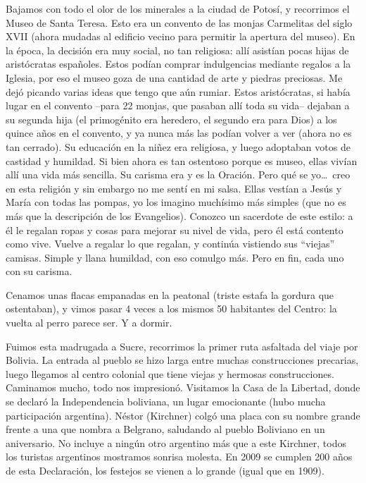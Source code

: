 Bajamos con todo el olor de los minerales a la ciudad de Potosí, y recorrimos
el Museo de Santa Teresa. Esto era un convento de las monjas Carmelitas del
siglo {\small XVII} (ahora mudadas al edificio vecino para permitir la
apertura del museo). En la época, la decisión era muy social, no tan
religiosa: allí asistían pocas hijas de aristócratas españoles. Estos
podían comprar indulgencias mediante regalos a la Iglesia, por eso el museo
goza de una cantidad de arte y piedras preciosas. Me dejó picando varias ideas
que tengo que aún rumiar. Estos aristócratas, si había lugar en el convento
--para 22 monjas, que pasaban allí toda su vida-- dejaban a su segunda hija (el
primogénito era heredero, el segundo era para Dios) a los quince años en el
convento, y ya nunca más las podían volver a ver (ahora no es tan cerrado). Su
educación en la niñez era religiosa, y luego adoptaban votos de castidad y
humildad. Si bien ahora es tan ostentoso porque es museo, ellas vivían allí
una vida más sencilla. Su carisma era y es la Oración. Pero qué se yo\ldots\
creo en esta religión y sin embargo no me sentí en mi salsa. Ellas vestían a
Jesús y María con todas las pompas, yo los imagino muchísimo más simples
(que no es más que la descripción de los Evangelios). Conozco un sacerdote de
este estilo: a él le regalan ropas y cosas para mejorar su nivel de vida, pero
él está contento como vive. Vuelve a regalar lo que regalan, y continúa
vistiendo sus ``viejas'' camisas. Simple y llana humildad, con eso comulgo más.
Pero en fin, cada uno con su carisma.

Cenamos unas flacas empanadas en la peatonal (triste estafa la gordura que
ostentaban), y vimos pasar 4 veces a los mismos 50 habitantes del Centro: la
vuelta al perro parece ser. Y a dormir.

Fuimos esta madrugada a Sucre, recorrimos la primer ruta asfaltada del viaje por
Bolivia. La entrada al pueblo se hizo larga entre muchas construcciones
precarias, luego llegamos al centro colonial que tiene viejas y hermosas
construcciones. Caminamos mucho, todo nos impresionó. Visitamos la Casa de la
Libertad, donde se declaró la Independencia boliviana, un lugar emocionante
(hubo mucha participación argentina). Néstor (Kirchner) colgó una placa con
su nombre grande frente a una que nombra a Belgrano, saludando al pueblo
Boliviano en un aniversario. No incluye a ningún otro argentino más que a este
Kirchner, todos los turistas argentinos mostramos sonrisa molesta. En 2009 se
cumplen 200 años de esta Declaración, los festejos se vienen a lo grande
(igual que en 1909).

